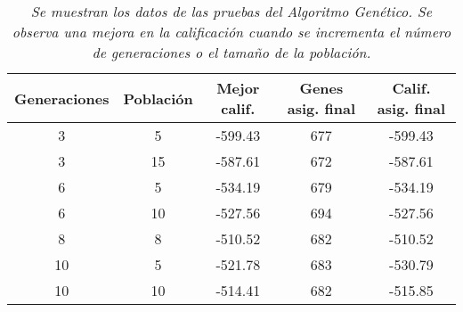 \begin{table}[H]
\centering
\begin{tabular}{|c|c|c|c|c|}
\hline 
 \textbf{Generaciones} & \textbf{Población} & \textbf{Mejor calif.} & \textbf{Genes asig. final} & \textbf{Calif. asig. final} \\ \hline
 3 & 5 & -599.43 & 677 & -599.43 \\ \hline
 3 & 15 & -587.61 & 672 & -587.61 \\ \hline
 6 & 5 & -534.19 & 679 & -534.19 \\ \hline
 6 & 10 & -527.56 & 694 & -527.56 \\ \hline
 8 & 8 & -510.52 & 682 & -510.52 \\ \hline
 10 & 5 & -521.78 & 683 & -530.79 \\ \hline
 10 & 10 & -514.41 & 682 & -515.85 \\ \hline
\end{tabular}
\caption[\textit{Resumen de las pruebas del Algoritmo Genético}]{\textit{Se muestran los datos de las pruebas del Algoritmo Genético. Se observa una mejora en la calificación cuando se incrementa el número de generaciones o el tamaño de la población.}}\label{ResumenPruebasAG}
\end{table}



